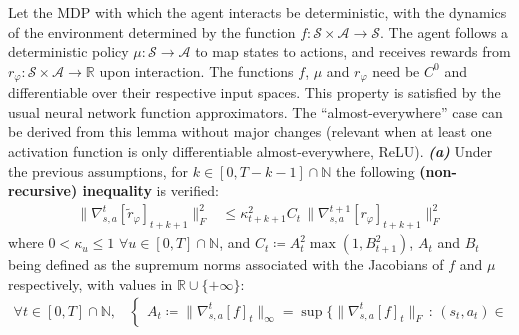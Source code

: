 \begin{algorithm}
{    
}
\caption{%
\small
SAM augmented with our provably more robust extension
\emph{Pessimistic Reward Preconditioning Enforcing Lipschitzness},
dubbed \textbf{``PURPLE''} (with minor vowel filling and letter shuffle for legibility). \\
\textcolor{red}{Text in red color}: differing from SAM (\textit{cf.}~\textsc{Algorithm}~\ref{algosam})}
\label{algopurple}
\end{algorithm}
\DecMargin{1em}

\begin{lemma}
\label{lemmapurple}
Let the MDP with which the agent interacts be deterministic,
with the dynamics of the environment determined
by the function $f: \mathcal{S} \times \mathcal{A} \rightarrow \mathcal{S}$.
The agent follows a deterministic policy $\mu: \mathcal{S} \rightarrow \mathcal{A}$
to map states to actions,
and receives rewards from
$r_\varphi: \mathcal{S} \times \mathcal{A} \rightarrow \mathbb{R}$
upon interaction.
The functions $f$, $\mu$ and $r_\varphi$ need be $C^0$ and differentiable
over their respective input spaces.
This property is satisfied by the usual neural network function approximators.
The ``almost-everywhere'' case can be derived from this lemma without major changes
(relevant when at least one activation function is only differentiable almost-everywhere, ReLU).
\textbf{\emph{(a)}} Under the previous assumptions,
for $k \in [0, T-k-1] \cap \mathbb{N}$ the following \textbf{(non-recursive) inequality} is verified:
\begin{align}
\lVert \nabla_{s,a}^t[\tilde{r}_\varphi]_{t+k+1} \rVert ^2_F
&\leq
\kappa_{t+k+1}^2
C_t
\, \lVert \nabla_{s,a}^{t+1}[r_\varphi]_{t+k+1} \rVert ^2_F
\end{align}
where $0 < \kappa_u \leq 1$ $\forall u \in [0, T] \cap \mathbb{N}$,
and $C_t \coloneqq A_t^2 \max(1, B_{t+1}^2)$,
$A_t$ and $B_t$ being defined as the supremum norms associated with the Jacobians of $f$
and $\mu$ respectively, with values in $\mathbb{R} \cup \{+\infty\}$:
\begin{align}
\forall t \in [0, T] \cap \mathbb{N} \text{,} \quad
\begin{cases}
A_t \coloneqq \lVert\nabla_{s,a}^t[f]_t\rVert _\infty
= \sup \big\{\lVert\nabla_{s,a}^t[f]_t\rVert _F \, : \, (s_t, a_t) \in

\end{cases}
\end{align}
\end{lemma}
